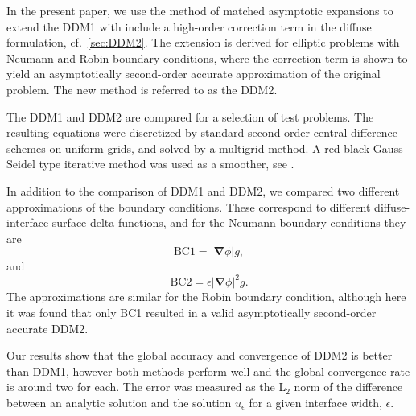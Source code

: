 \documentclass[11pt,b5paper,DIV=calc,BCOR1.3cm,headings=small,%
               footinclude=false,headsepline]{scrbook}
\newcommand*{\del}{\boldsymbol\nabla}
\newcommand*{\grad}{\del}
\begin{document}
In the present paper, we use the method of matched asymptotic expansions to
extend the DDM1 with include a high-order correction term in the diffuse
formulation, cf.\ \cref{sec:DDM2}.  The extension is derived for elliptic
problems with Neumann and Robin boundary conditions, where the correction term
is shown to yield an asymptotically second-order accurate approximation of the
original problem.  The new method is referred to as the DDM2.

The DDM1 and DDM2 are compared for a selection of test problems.  The resulting
equations were discretized by standard second-order central-difference schemes
on uniform grids, and solved by a multigrid method.  A red-black Gauss-Seidel
type iterative method was used as a smoother, see \cite{Wise07}.

In addition to the comparison of DDM1 and DDM2, we compared two different
approximations of the boundary conditions.  These correspond to different
diffuse-interface surface delta functions, and for the Neumann boundary
conditions they are
\begin{equation}
  \text{BC1} = |\grad\phi| g,
\end{equation}
and
\begin{equation}
  \text{BC2} = \epsilon|\grad\phi|^2 g.
\end{equation}
The approximations are similar for the Robin boundary condition, although here
it was found that only BC1 resulted in a valid asymptotically second-order
accurate DDM2.

Our results show that the global accuracy and convergence of DDM2 is better
than DDM1, however both methods perform well and the global convergence rate is
around two for each.  The error was measured as the L$_2$ norm of the
difference between an analytic solution and the solution $u_\epsilon$ for
a given interface width, $\epsilon$.
\end{document}
